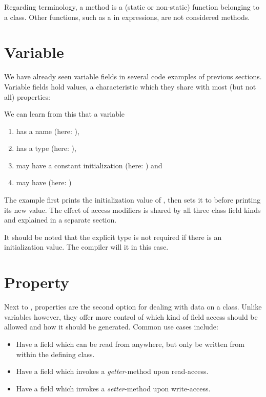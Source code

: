 \documentclass{haxe}
\begin{document}
Regarding terminology, a method is a (static or non-static) function belonging to a class. Other functions, such as a  in expressions, are not considered methods.


\section{Variable}
\label{class-field-variable}

We have already seen variable fields in several code examples of previous sections. Variable fields hold values, a characteristic which they share with most (but not all) properties:

We can learn from this that a variable

\begin{enumerate}
	\item has a name (here: ),
	\item has a type (here: ),
	\item may have a constant initialization (here: ) and
	\item may have  (here: )
\end{enumerate}

The example first prints the initialization value of , then sets it to  before printing its new value. The effect of access modifiers is shared by all three class field kinds and explained in a separate section.

It should be noted that the explicit type is not required if there is an initialization value. The compiler will  it in this case.




\section{Property}
\label{class-field-property}

Next to , properties are the second option for dealing with data on a class. Unlike variables however, they offer more control of which kind of field access should be allowed and how it should be generated. Common use cases include:

\begin{itemize}
	\item Have a field which can be read from anywhere, but only be written from within the defining class.
	\item Have a field which invokes a \emph{getter}-method upon read-access.
	\item Have a field which invokes a \emph{setter}-method upon write-access.
\end{itemize}
\end{document}
